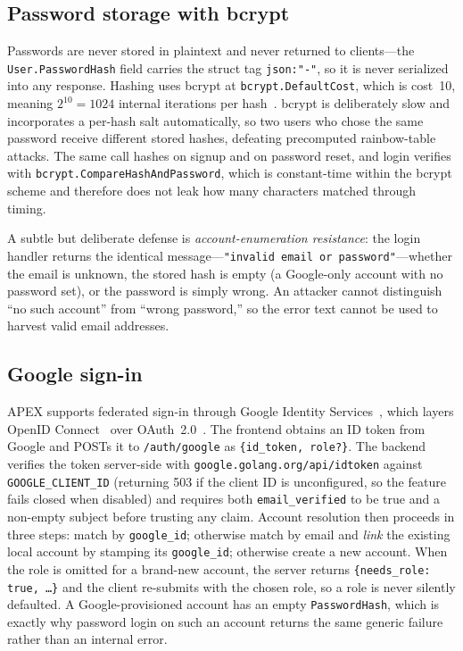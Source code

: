 \subsection{Password storage with bcrypt}
\label{sec:bcrypt}

Passwords are never stored in plaintext and never returned to clients---the
\texttt{User.PasswordHash} field carries the struct tag \texttt{json:"-"}, so it
is never serialized into any response. Hashing uses bcrypt at
\texttt{bcrypt.DefaultCost}, which is cost~10, meaning $2^{10}=1024$ internal
iterations per hash~\cite{provos1999bcrypt}. bcrypt is deliberately slow and
incorporates a per-hash salt automatically, so two users who chose the same
password receive different stored hashes, defeating precomputed rainbow-table
attacks. The same call hashes on signup and on password reset, and login
verifies with \texttt{bcrypt.CompareHashAndPassword}, which is constant-time
within the bcrypt scheme and therefore does not leak how many characters matched
through timing.

A subtle but deliberate defense is \emph{account-enumeration resistance}: the
login handler returns the identical message---\texttt{"invalid email or
password"}---whether the email is unknown, the stored hash is empty (a
Google-only account with no password set), or the password is simply wrong. An
attacker cannot distinguish ``no such account'' from ``wrong password,'' so the
error text cannot be used to harvest valid email addresses.

\subsection{Google sign-in}
\label{sec:google}

APEX supports federated sign-in through Google Identity Services~\cite{gids},
which layers OpenID Connect~\cite{oidc-core} over OAuth~2.0~\cite{rfc6749}. The
frontend obtains an ID token from Google and POSTs it to \texttt{/auth/google}
as \texttt{\{id\_token, role?\}}. The backend verifies the token server-side
with \texttt{google.golang.org/api/idtoken} against \texttt{GOOGLE\_CLIENT\_ID}
(returning 503 if the client ID is unconfigured, so the feature fails closed
when disabled) and requires both \texttt{email\_verified} to be true and a
non-empty subject before trusting any claim. Account resolution then proceeds in
three steps: match by \texttt{google\_id}; otherwise match by email and
\emph{link} the existing local account by stamping its \texttt{google\_id};
otherwise create a new account. When the role is omitted for a brand-new
account, the server returns \texttt{\{needs\_role: true, \dots\}} and the client
re-submits with the chosen role, so a role is never silently defaulted. A
Google-provisioned account has an empty \texttt{PasswordHash}, which is exactly
why password login on such an account returns the same generic failure rather
than an internal error.


